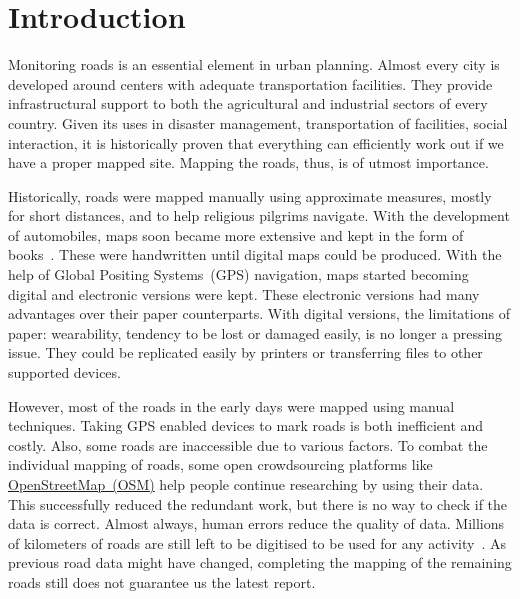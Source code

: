 \chapter{Introduction}\label{chapt:intro}

Monitoring roads is an essential element in urban planning. Almost every city is developed around centers with adequate transportation facilities. They provide infrastructural support to both the agricultural and industrial sectors of every country. Given its uses in disaster management, transportation of facilities, social interaction, it is historically proven that everything can efficiently work out if we have a proper mapped site. Mapping the roads, thus, is of utmost importance.

Historically, roads were mapped manually using approximate measures, mostly for short distances, and to help religious pilgrims navigate. With the development of automobiles, maps soon became more extensive and kept in the form of books~\cite{firstMapBooks}. These were handwritten until digital maps could be produced. With the help of Global Positing Systems~(GPS) navigation, maps started becoming digital and electronic versions were kept. These electronic versions had many advantages over their paper counterparts. With digital versions, the limitations of paper: wearability, tendency to be lost or damaged easily, is no longer a pressing issue. They could be replicated easily by printers or transferring files to other supported devices.

However, most of the roads in the early days were mapped using manual techniques. Taking GPS enabled devices to mark roads is both inefficient and costly. Also, some roads are inaccessible due to various factors. To combat the individual mapping of roads, some open crowdsourcing platforms like \href{https://www.openstreetmap.org/}{OpenStreetMap~(OSM)}  help people continue researching by using their data. This successfully reduced the redundant work, but there is no way to check if the data is correct. Almost always, human errors reduce the quality of data. Millions of kilometers of roads are still left to be digitised to be used for any activity~\cite{MapsDoneOSM}. As previous road data might have changed, completing the mapping of the remaining roads still does not guarantee us the latest report.

